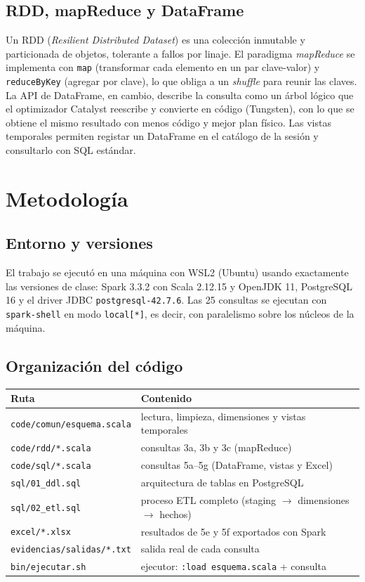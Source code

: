 \documentclass[10pt,a4paper]{article}
\theoremstyle{definition}
\begin{document}
\subsection{RDD, mapReduce y DataFrame}
Un RDD (\emph{Resilient Distributed Dataset}) es una colecci\'on inmutable y particionada de
objetos, tolerante a fallos por linaje. El paradigma \emph{mapReduce} se implementa con
\texttt{map} (transformar cada elemento en un par clave-valor) y \texttt{reduceByKey} (agregar
por clave), lo que obliga a un \emph{shuffle} para reunir las claves. La API de DataFrame, en
cambio, describe la consulta como un \'arbol l\'ogico que el optimizador Catalyst reescribe y
convierte en c\'odigo (Tungsten), con lo que se obtiene el mismo resultado con menos c\'odigo y
mejor plan f\'isico. Las vistas temporales permiten registar un DataFrame en el cat\'alogo de la
sesi\'on y consultarlo con SQL est\'andar.





\section{Metodolog\'ia}

\subsection{Entorno y versiones}
El trabajo se ejecut\'o en una m\'aquina con WSL2 (Ubuntu) usando exactamente las versiones de
clase: Spark 3.3.2 con Scala 2.12.15 y OpenJDK 11, PostgreSQL 16 y el driver JDBC
\texttt{postgresql-42.7.6}. Las 25 consultas se ejecutan con \texttt{spark-shell} en modo
\texttt{local[*]}, es decir, con paralelismo sobre los n\'ucleos de la m\'aquina.

\subsection{Organizaci\'on del c\'odigo}
\begin{center}
\begin{tabular}{ll}
\toprule
Ruta & Contenido\\
\midrule
\texttt{code/comun/esquema.scala} & lectura, limpieza, dimensiones y vistas temporales\\
\texttt{code/rdd/*.scala} & consultas 3a, 3b y 3c (mapReduce)\\
\texttt{code/sql/*.scala} & consultas 5a--5g (DataFrame, vistas y Excel)\\
\texttt{sql/01\_ddl.sql} & arquitectura de tablas en PostgreSQL\\
\texttt{sql/02\_etl.sql} & proceso ETL completo (staging $\to$ dimensiones $\to$ hechos)\\
\texttt{excel/*.xlsx} & resultados de 5e y 5f exportados con Spark\\
\texttt{evidencias/salidas/*.txt} & salida real de cada consulta\\
\texttt{bin/ejecutar.sh} & ejecutor: \texttt{:load esquema.scala} + consulta\\
\bottomrule
\end{tabular}
\end{center}
\end{document}
